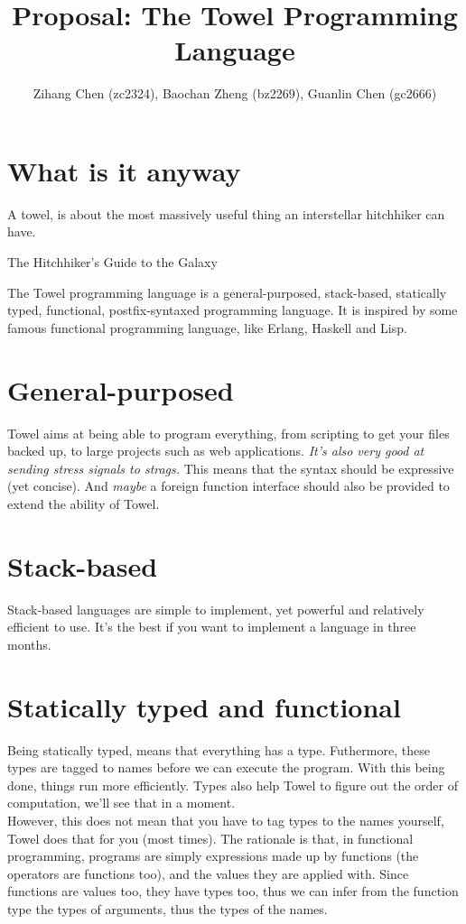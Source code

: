 \documentclass{article}
\title{Proposal: The Towel Programming Language}
\author{Zihang Chen (zc2324), Baochan Zheng (bz2269), Guanlin Chen (gc2666)}
\begin{document}
\maketitle

\section{What is it anyway}

\epigraph{A towel, is about the most massively useful thing an interstellar hitchhiker can have.}{The Hitchhiker's Guide to the Galaxy}


The Towel programming language is a general-purposed, stack-based, statically typed, functional, postfix-syntaxed programming language. It is inspired by some famous functional programming language, like Erlang, Haskell and Lisp.

\section{General-purposed}

Towel aims at being able to program everything, from scripting to get your files backed up, to large projects such as web applications. \textit{It's also very good at sending stress signals to strags.} This means that the syntax should be expressive (yet concise). And \textit{maybe} a foreign function interface should also be provided to extend the ability of Towel.

\section{Stack-based}

Stack-based languages are simple to implement, yet powerful and relatively efficient to use. It's the best if you want to implement a language in three months.

\section{Statically typed and functional}

Being statically typed, means that everything has a type. Futhermore, these types are tagged to names before we can execute the program. With this being done, things run more efficiently. Types also help Towel to figure out the order of computation, we'll see that in a moment.\\

However, this does not mean that you have to tag types to the names yourself, Towel does that for you (most times). The rationale is that, in functional programming, programs are simply expressions made up by functions (the operators are functions too), and the values they are applied with. Since functions are values too, they have types too, thus we can infer from the function type the types of arguments, thus the types of the names.\\
\end{document}
